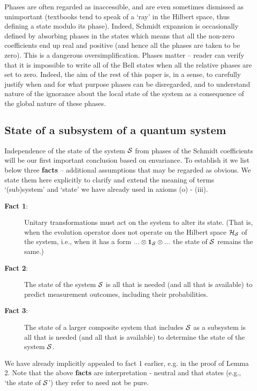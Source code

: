 \documentclass[aps,pra,epsfig,11pt,floatfix]{revtex4}
\begin{document}
Phases are often regarded as inaccessible, and are even sometimes dismissed 
as unimportant (textbooks tend to speak of a `ray' in the Hilbert space, thus 
defining a state modulo its phase). Indeed, Schmidt expansion is occasionally 
defined by absorbing phases in the states which means that all the non-zero 
coefficients end up real and positive (and hence all the phases are taken to be zero).
This is a dangerous oversimplification. Phases matter -- reader can verify that 
it is impossible to write all of the Bell states when all the relative phases are set 
to zero. Indeed, the aim of the rest of this paper is, in a sense, to carefully justify
when and for what purpose phases can be disregarded, and to understand 
nature of the ignorance about the local state of the system as a consequence
of the global nature of these phases.  

\subsection{State of a subsystem of a quantum system}

Independence of the state of the system ${\cal S}$ from phases of
the Schmidt coefficients will be our first important conclusion based 
on envariance. To establish it we list below three {\bf facts} -- additional
assumptions that may be regarded as obvious.  We state them here
explicitly to clarify and extend the meaning of terms `(sub)system' and `state' 
we have already used in axioms (o) - (iii).
\begin{description}
\item[{\bf Fact 1}:] Unitary transformations must act on the system to alter
its state. (That is, when the evolution operator does not operate on the
Hilbert space ${\cal H_S}$ of the system, i.e., when it has a form $...\otimes
{\bf 1}_{\cal S} \otimes...$ the state of ${\cal S}$ remains the same.)
\item[{\bf Fact 2}:] The state of the system ${\cal S}$ is all that is needed
(and all that is available) to predict measurement outcomes, including their
probabilities.
\item[{\bf Fact 3}:] The state of a larger composite system that includes
${\cal S}$ as a subsystem is all that is needed (and all that is available)
to determine the state of the system ${\cal S}$.
\end{description}
\noindent We have already implicitly appealed to fact 1 earlier,
e.g. in the proof of Lemma 2. Note that the above {\bf facts} are interpretation
- neutral and that states (e.g., `the state of ${\cal S}$') they refer to need
not be pure.
\end{document}

